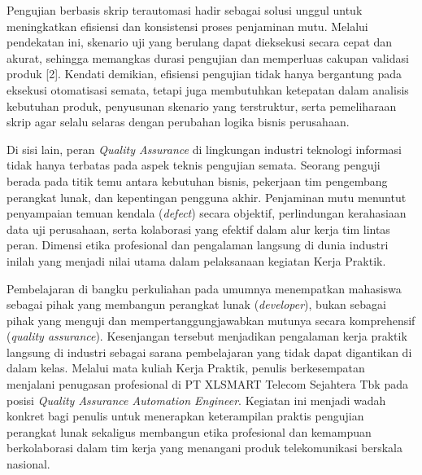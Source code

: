 \documentclass[12pt,a4paper]{article}
\begin{document}
Pengujian berbasis skrip terautomasi hadir sebagai solusi unggul untuk meningkatkan efisiensi dan konsistensi proses penjaminan mutu. Melalui pendekatan ini, skenario uji yang berulang dapat dieksekusi secara cepat dan akurat, sehingga memangkas durasi pengujian dan memperluas cakupan validasi produk [2]. Kendati demikian, efisiensi pengujian tidak hanya bergantung pada eksekusi otomatisasi semata, tetapi juga membutuhkan ketepatan dalam analisis kebutuhan produk, penyusunan skenario yang terstruktur, serta pemeliharaan skrip agar selalu selaras dengan perubahan logika bisnis perusahaan.

Di sisi lain, peran \textit{Quality Assurance} di lingkungan industri teknologi informasi tidak hanya terbatas pada aspek teknis pengujian semata. Seorang penguji berada pada titik temu antara kebutuhan bisnis, pekerjaan tim pengembang perangkat lunak, dan kepentingan pengguna akhir. Penjaminan mutu menuntut penyampaian temuan kendala (\textit{defect}) secara objektif, perlindungan kerahasiaan data uji perusahaan, serta kolaborasi yang efektif dalam alur kerja tim lintas peran. Dimensi etika profesional dan pengalaman langsung di dunia industri inilah yang menjadi nilai utama dalam pelaksanaan kegiatan Kerja Praktik.

Pembelajaran di bangku perkuliahan pada umumnya menempatkan mahasiswa sebagai pihak yang membangun perangkat lunak (\textit{developer}), bukan sebagai pihak yang menguji dan mempertanggungjawabkan mutunya secara komprehensif (\textit{quality assurance}). Kesenjangan tersebut menjadikan pengalaman kerja praktik langsung di industri sebagai sarana pembelajaran yang tidak dapat digantikan di dalam kelas. Melalui mata kuliah Kerja Praktik, penulis berkesempatan menjalani penugasan profesional di PT XLSMART Telecom Sejahtera Tbk pada posisi \textit{Quality Assurance Automation Engineer}. Kegiatan ini menjadi wadah konkret bagi penulis untuk menerapkan keterampilan praktis pengujian perangkat lunak sekaligus membangun etika profesional dan kemampuan berkolaborasi dalam tim kerja yang menangani produk telekomunikasi berskala nasional.
\end{document}
